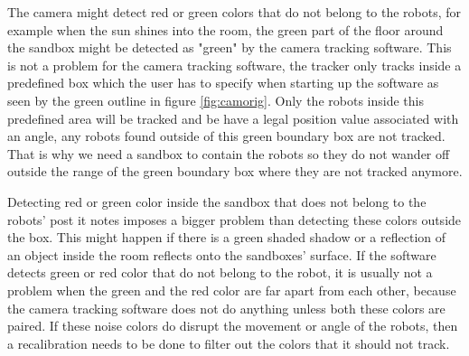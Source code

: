 The camera might detect red or green colors that do not belong to the robots, for example when the sun shines into the room, the green part of the floor around the sandbox might be detected as "green" by the camera tracking software. This is not a problem for the camera tracking software, the tracker only tracks inside a predefined box which the user has to specify when starting up the software as seen by the green outline in figure \ref{fig:camorig}. Only the robots inside this predefined area will be tracked and be have a legal position value associated with an angle, any robots found  outside of this green boundary box are not tracked. That is why we need a sandbox to contain the robots so they do not wander off outside the range of the green boundary box where they are not tracked anymore.

Detecting red or green color inside the sandbox that does not belong to the robots' post it notes imposes a bigger problem than detecting these colors outside the box. This might happen if there is a green shaded shadow or a reflection of an object inside the room reflects onto the sandboxes' surface. 
If the software detects green or red color that do not belong to the robot, it is usually not a problem when the green and the red color are far apart from each other, because the camera tracking software does not do anything unless both these colors are paired. If these noise colors do disrupt the movement or angle of the robots, then a recalibration needs to be done to filter out the colors that it should not track.


